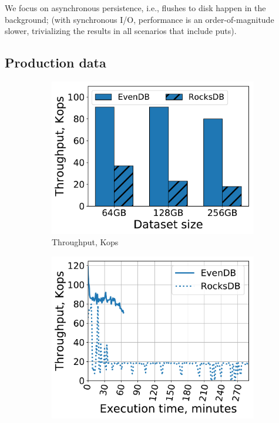 We focus on asynchronous persistence,  i.e., flushes to disk happen in the background; 
(with synchronous I/O, performance is an order-of-magnitude slower, trivializing the results 
in all scenarios that include puts). 


\subsection{Production data}
\label{ssec:prod}

\begin{figure}[tb]
\centering
\begin{subfigure}{0.3\linewidth}
\includegraphics[width=\textwidth]{figs/ingestion.pdf}
\caption{Throughput, Kops}
\label{fig:prod:ingestion:a}
\end{subfigure}
\hspace{0.03\linewidth} 
\begin{subfigure}{0.3\linewidth}
\includegraphics[width=\textwidth]{figs/throughput_256_ingestions_line.pdf}

\end{subfigure}
\end{figure}
